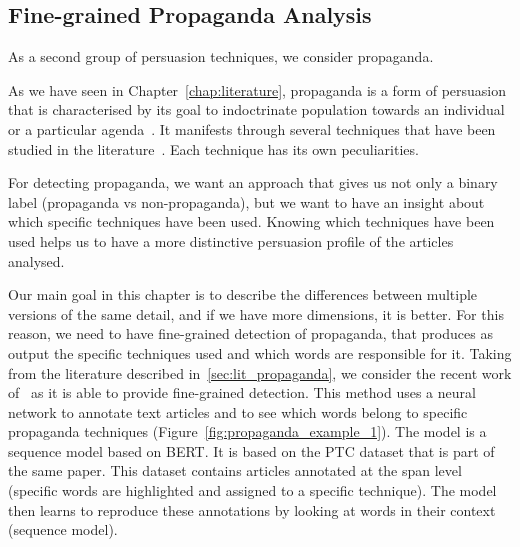 




\subsection{\statusgreen Fine-grained Propaganda Analysis}
\label{ssec:lp_techniques_propaganda}

As a second group of persuasion techniques, we consider \gls{propaganda}.

As we have seen in Chapter~\ref{chap:literature}, propaganda is a form of persuasion that is characterised by its goal to indoctrinate population towards an individual or a particular agenda~\citep{bernays}.
It manifests through several techniques that have been studied in the literature~\citep{torok2015symbiotic}. Each technique has its own peculiarities.

For detecting propaganda, we want an approach that gives us not only a binary label (propaganda vs non-propaganda), but we want to have an insight about which specific techniques have been used.
Knowing which techniques have been used helps us to have a more distinctive persuasion profile of the articles analysed.

Our main goal in this chapter is to describe the differences between multiple versions of the same detail, and if we have more dimensions, it is better.
For this reason, we need to have fine-grained detection of propaganda, that produces as output the specific techniques used and which words are responsible for it.
Taking from the literature described in~\ref{sec:lit_propaganda}, we consider the recent work of~\cite{da2019fine} as it is able to provide fine-grained detection. This method uses a neural network to annotate text articles and to see which words belong to specific propaganda techniques (Figure~\ref{fig:propaganda_example_1}).
The model is a sequence model based on BERT. It is based on the PTC dataset that is part of the same paper. This dataset contains articles annotated at the span level (specific words are highlighted and assigned to a specific technique). The model then learns to reproduce these annotations by looking at words in their context (sequence model).

